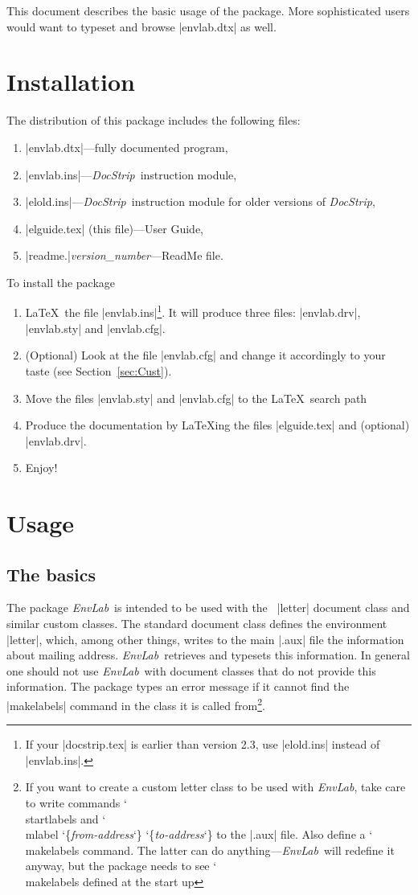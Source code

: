 \documentclass{ltxguide}
\newcommand{\EL}{\textsl{EnvLab}}
\newcommand{\DS}{\textsl{DocStrip}}
\providecommand{\cs}[1]{{\ttfamily\char`\\{}#1}}
\providecommand\marg[1]{%
 {\ttfamily\char`\{}{\em#1\/}{\ttfamily\char`\}}}
\begin{document}
This document describes the basic usage of the package. More
sophisticated users would want to typeset and browse |envlab.dtx| as
well. 

\section{Installation}
\label{sec:Install}

The distribution of this package includes the following files:
\begin{enumerate}
\item |envlab.dtx|---fully documented program,
\item |envlab.ins|---\DS\ instruction module,
\item |elold.ins|---\DS\ instruction module for older
  versions of \DS,
\item |elguide.tex| (this file)---User Guide,
\item |readme.|\emph{version\_number}---ReadMe file.
\end{enumerate}
To install the package
\begin{enumerate}
\item \LaTeX\ the file |envlab.ins|\footnote{If your |docstrip.tex| is
    earlier than version 2.3, use |elold.ins| instead of
    |envlab.ins|.}.  It will produce three files: |envlab.drv|,
  |envlab.sty| and |envlab.cfg|.
\item (Optional) Look at the file |envlab.cfg| and change it
  accordingly to your taste (see Section~\ref{sec:Cust}).
\item Move the files |envlab.sty| and  |envlab.cfg| to the
  \LaTeX\ search path
\item Produce the documentation by \LaTeX ing the files |elguide.tex|
  and (optional) |envlab.drv|.
\item Enjoy!
\end{enumerate}


\section{Usage}
\label{sec:Usage}


\subsection{The basics}
\label{sec:Basics}

The package \EL\ is intended to be used with the \LaTeXe\ |letter|
document class and similar custom classes. The standard document class
defines the environment |letter|, which, among other things, writes to
the main |.aux| file the information about mailing address. \EL\ 
retrieves and typesets this information. In general one should not use
\EL\ with document classes that do not provide this information. The
package types an error message if it cannot find the |makelabels|
command in the class it is called from\footnote{If you want to create
  a custom letter class to be used with \EL, take care to write
  commands \cs{startlabels} and \cs{mlabel}\marg{from-address}\marg{to-address} 
  to the |.aux| file. Also
  define a \cs{makelabels} command. The latter can do
  anything---\EL\ will redefine it anyway, but the package needs to see 
  \cs{makelabels} defined at the start up}.
\end{document}
